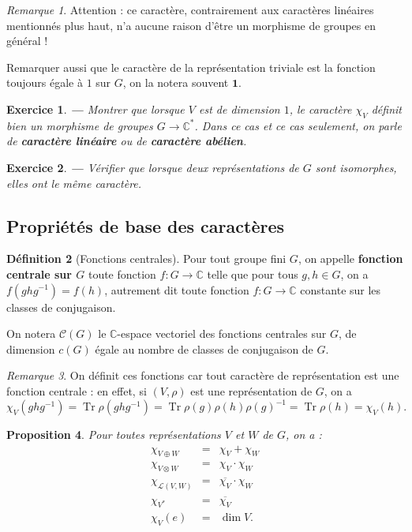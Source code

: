 \documentclass[a4paper]{article}
\newcounter{question}
\newtheorem{enonce}{Exercice}
\newenvironment{exo}[0]{\begin{enonce}{\bf ---}\rm\setcounter{question}{1}}{\end{enonce}}
\theoremstyle{definition} %
\newtheorem{Def}{Définition}[section] %
\theoremstyle{plain} %
\newtheorem{Prop}[Def]{Proposition} %
\theoremstyle{remark} %
\newtheorem{Rq}[Def]{Remarque} %
\begin{document}
\begin{Rq}
	Attention : ce caractère, contrairement aux caractères linéaires mentionnés plus haut, n'a aucune raison d'être un morphisme de groupes en général !
	
	Remarquer aussi que le caractère de la représentation triviale est la fonction toujours égale à $1$ sur $G$, on la notera souvent $\mathbf{1}$.
\end{Rq}	

\begin{exo}
	Montrer que lorsque $V$ est de dimension $1$, le caractère $\chi_V$ définit bien un morphisme de groupes $G \rightarrow \mathbb{C}^*$. Dans ce cas et ce cas seulement, on parle de \textbf{caractère linéaire} ou de \textbf{caractère abélien}.
\end{exo}


\begin{exo}
	Vérifier que lorsque deux représentations de $G$ sont isomorphes, elles ont le même caractère.
	
\end{exo}

\subsection{Propriétés de base des caractères}
\begin{Def}[Fonctions centrales]
	\hspace*{\fill}
	
	Pour tout groupe fini $G$, on appelle \textbf{fonction centrale sur $G$} toute fonction $f : G \rightarrow \mathbb{C}$ telle que pour tous $g,h \in G$, on a $f(gh g^{-1})=f(h)$,
	autrement dit toute fonction $f : G \rightarrow \mathbb{C}$ constante sur les classes de conjugaison.
	
	 On notera $\mathcal{C}(G)$ le $\mathbb{C}$-espace vectoriel des fonctions centrales sur $G$, de dimension $c(G)$ égale au nombre de classes de conjugaison de $G$.
\end{Def}

\begin{Rq}
 On définit ces fonctions car tout caractère de représentation est une fonction centrale : en effet, si $(V,\rho)$ est une représentation de $G$, on a 
	$$\chi_V(ghg^{-1}) = \operatorname{Tr} \rho(ghg^{-1}) = \operatorname{Tr} \rho(g) \rho(h) \rho(g)^{-1} = \operatorname{Tr} \rho(h) = \chi_V(h).$$
\end{Rq}

\begin{Prop}\label{propCaractères_opérations_usuelles}
Pour toutes représentations $V$ et $W$ de $G$, on a : 
	\begin{eqnarray*}
	\chi_{V \oplus W} & = & \chi_V + \chi_W \\
	\chi_{V \otimes W} & = & \chi_V \cdot \chi_W \\
	\chi_{\mathcal{L}(V,W)} & = & \overline{\chi_V} \cdot \chi_W \\
	\chi_{V^*} & = & \overline{\chi_V} \\
	\chi_V(e) & = & \dim V.
	\end{eqnarray*}
\end{Prop}
\end{document}
